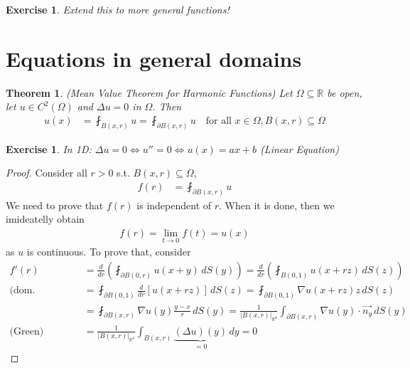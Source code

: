 \documentclass{report}
\theoremstyle{tommy}
\newtheorem{thm}[defn]{Theorem}
\newtheorem{ex}[defn]{Exercise}
\begin{document}
\begin{ex}
  Extend this to more general functions!
\end{ex}

\section{Equations in general domains}
\begin{thm}(Mean Value Theorem for Harmonic Functions)
  Let \(\Omega \subseteq \mathbb{R}\) be open, let \( u \in C^2(\Omega)\) and \(\Delta u = 0\) in \(\Omega\). Then
  \begin{align*}
    u(x) 
    &= \fint_{B(x, r)} u
    = \fint_{\partial B(x, r)} u \quad \text{for all } x \in \Omega, B(x,r) \subseteq \Omega
  \end{align*}
\end{thm}

\begin{ex}
  In 1D: \(\Delta u = 0 \Leftrightarrow u'' = 0 \Leftrightarrow u(x) = ax + b\) (Linear Equation)
\end{ex}

\begin{proof}
  Consider all \(r > 0\) s.t. \(B(x,r) \subseteq \Omega\),
  \begin{align*}
    f(r) &= \fint_{\partial B(x,r)} u
  \end{align*}
  We need to prove that \(f(r)\) is independent of \(r\). When it is done, then we imideatelly obtain
  \begin{align*}
    f(r) = \lim_{t \to 0} f(t) = u(x)
  \end{align*}
  as \(u\) is continuous. To prove that, consider
  \begin{align*}
    f'(r) 
    &= \frac{d}{dr} \left(\fint_{\partial B(0, r)} u(x+y) \, dS(y) \right) 
    = \frac{d}{dr} \left(\fint_{B(0, 1)} u(x + rz) \, dS(z) \right) \\
    \text{(dom. convergence)} \quad & = \fint_{\partial B(0, 1)} \frac{d}{dr} [u(x + rz)] \, dS(z)
    = \fint_{\partial B(0, 1)} \nabla u(x + rz) z \, dS(z) \\
    &= \fint_{\partial B(x, r)} \nabla u(y) \frac{y-x}{r} \, dS(y)
    = \frac{1}{|B(x, r)|_{\mathbb{R}^d}} \int_{\partial B(x, r)} \nabla u(y) \cdot \vec{n_y} \, dS(y) \\
    \text{(Green)} \quad &= \frac{1}{|B(x, r)|_{\mathbb{R}^d}} \int_{B(x, r)} \underbrace{(\Delta u)(y)}_{= 0} \, dy = 0
  \end{align*}
\end{proof}
\end{document}
